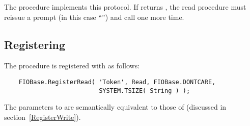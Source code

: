 The procedure  implements this
protocol.  If  returns ,
the  read procedure must reissue a prompt (in this
case ``'') and call
 one more time.  


\subsection{Registering }
The procedure is registered with  as follows:
\begin{verbatim}
    FIOBase.RegisterRead( 'Token', Read, FIOBase.DONTCARE,
                          SYSTEM.TSIZE( String ) );
\end{verbatim}
The parameters to  are semantically
equivalent to those of  (discussed
in section~\ref{RegisterWrite}).
